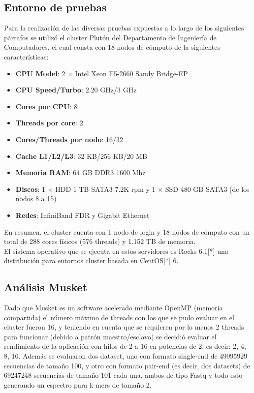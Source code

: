 \documentclass[conference]{IEEEtran}
\begin{document}
\subsection{Entorno de pruebas}
Para la realización de las diversas pruebas expuestas a lo largo de los siguientes párrafos se utilizó el cluster Plutón del Departamento de Ingeniería de Computadores, el cual consta con 18 nodos de cómputo de la siguientes características:\\ 

\begin{itemize}
	\item \textbf{CPU Model}: 2 × Intel Xeon E5-2660 Sandy Bridge-EP
	\item \textbf{CPU Speed/Turbo}: 2.20 GHz/3 GHz
	\item \textbf{Cores por CPU}: 8
	\item \textbf{Threads por core}: 2
	\item \textbf{Cores/Threads por nodo}: 16/32
	\item \textbf{Cache L1/L2/L3}: 32 KB/256 KB/20 MB
	\item \textbf{Memoria RAM}: 64 GB DDR3 1600 Mhz
	\item \textbf{Discos}: 1 × HDD 1 TB SATA3 7.2K rpm y 1 × SSD 480 GB SATA3 (de los nodos 8 a 15)
	\item \textbf{Redes}: InfiniBand FDR y Gigabit Ethernet\\
\end{itemize}

En resumen, el cluster cuenta con 1 nodo de login y 18 nodos de cómputo con un total de 288 cores físicos (576 threads) y 1.152 TB de memoria.\\

El sistema operativo que se ejecuta en estos servidores es Rocks 6.1[*] una distribución para entornos cluster basada en CentOS[*] 6.

\subsection{Análisis Musket}
Dado que Musket es un software acelerado mediante OpenMP (memoria compartida) el número máximo de threads con los que se pudo evaluar en el cluster fueron 16, y teniendo en cuenta que se requieren por lo menos 2 threads para funcionar (debido a patrón maestro/esclavo) se decidió evaluar el rendimiento de la aplicación con hilos de 2 a 16 en potencias de 2, es decir: 2, 4, 8, 16. Además se evaluaron dos dataset, uno con formato single-end de 49995929 secuencias de tamaño 100, y otro con formato pair-end (es decir, dos datasets) de 69247248 secuencias de tamaño 101 cada una, ambos de tipo Fastq y todo esto generando un espectro para k-mers de tamaño 2.\\
\end{document}
